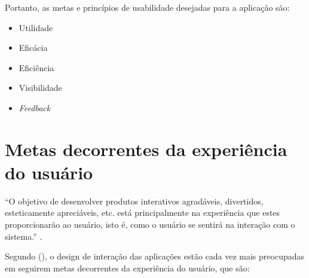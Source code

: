     Portanto, as metas e princípios de usabilidade desejadas para a aplicação são:
    
    \begin{itemize}
     \item Utilidade
     \item Eficácia
     \item Eficiência
     \item Visibilidade
     \item \textit{Feedback}
    \end{itemize}


  \section{Metas decorrentes da experiência do usuário}
    
    “O objetivo de desenvolver produtos interativos agradáveis, divertidos, esteticamente apreciáveis, etc. 
    está principalmente na experiência que estes proporcionarão ao usuário, isto é, como o usuário se 
    sentirá na interação com o sistema.” \cite{preece}.
    
    Segundo \citeauthor{preece} (\citeyear{preece}), o design de interação das aplicações estão cada vez mais preocupadas em seguirem 
    metas decorrentes da experiência do usuário, que são:
    
